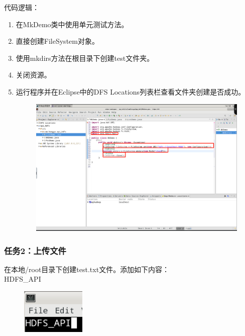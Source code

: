 \documentclass {article}
\begin{document}
				代码逻辑：
				\begin{enumerate}
					\item 在MkDemo类中使用单元测试方法。
					\item 直接创建FileSystem对象。
					\item 使用mkdirs方法在根目录下创建test文件夹。
					\item 关闭资源。
					\item 运行程序并在Eclipse中的DFS Locations列表栏查看文件夹创建是否成功。
					\begin{figure}[H]
						\centering
						\includegraphics[width=4.5in]{figures/fig18.png}
					\end{figure}
				\end{enumerate}
			
			\subsubsection{任务2：上传文件}
				在本地/root目录下创建test.txt文件。添加如下内容：\\
				HDFS\_API
				
				\begin{figure}[H]
					\centering
					\includegraphics{figures/fig19.png}
				\end{figure}
				
\end{document}
